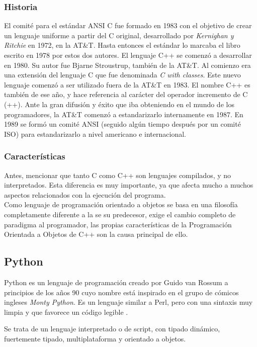 \documentclass[12pt]{book} %
\begin{document}
		\subsubsection{Historia}
			El comité para el estándar ANSI C fue formado en 1983 con el objetivo de crear un lenguaje uniforme a partir del C original,
			desarrollado por \textit{Kernighan y Ritchie} en 1972, en la AT\&T. Hasta entonces el estándar lo marcaba el libro escrito en
			1978 por estos dos autores. 
			El lenguaje C++ se comenzó a desarrollar en 1980. Su autor fue Bjarne Stroustrup, también de la AT\&T. 
			Al comienzo era una extensión del lenguaje C que fue denominada \textit{C with classes}. Este nuevo lenguaje comenzó a ser
			utilizado fuera de la AT\&T en 1983. El nombre C++ es también de ese año, y hace referencia al carácter del operador incremento
			de C (++). Ante la gran difusión y éxito que iba obteniendo en el mundo de los programadores, la AT\&T comenzó a estandarizarlo
			internamente en 1987. En 1989 se formó un comité ANSI (seguido algún tiempo después por un comité ISO) para estandarizarlo a
			nivel americano e internacional.
			
		 \subsubsection{Características}
		 	Antes, mencionar que tanto C como C++ son lenguajes compilados, y no interpretados. Esta diferencia es muy importante, ya que
		 	afecta mucho a muchos aspectos relacionados con la ejecución del programa.\\
		 	
		 	Como lenguaje de programación orientado a objetos  se basa en una filosofía completamente diferente a la se su predecesor, exige 
		 	el cambio completo de paradigma al programador, las propias características de la Programación Orientada a Objetos de C++ son 
		 	la causa principal de ello.
		 
		
		
	\subsection{Python \label{python}}
		Python es un lenguaje de programación creado por Guido van Rossum a principios de los años 90 cuyo nombre está inspirado en el grupo
		de cómicos ingleses \textit{Monty Python}. Es un lenguaje similar a Perl, pero con una sintaxis muy limpia y que favorece un código 
		legible \cite{python}.
		
		Se trata de un lenguaje interpretado o de script, con tipado dinámico, fuertemente tipado, multiplataforma y orientado a objetos.\\
		
\end{document}
